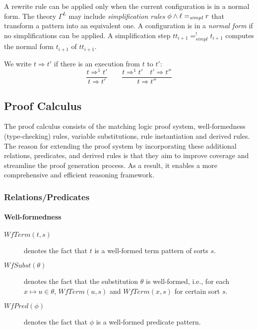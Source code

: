 \documentclass{article}
\theoremstyle{plain}
\theoremstyle{definition}
\newcommand{\WfTerm}{\ensuremath{\mathit{WfTerm}}}
\newcommand{\WfSubst}{\ensuremath{\mathit{WfSubst}}}
\newcommand{\WfPred}{\ensuremath{\mathit{WfPred}}}
\begin{document}
A rewrite rule can be applied only when the current configuration is in a normal form. 
The theory $\Gamma^L$ may include \emph{simplification rules} $\phi \land \ell =_ {\it simpl} r$ that transform a pattern into an equivalent one. A configuration is in a \emph{normal form} if no simplifications can be applied. A simplification step $tt_{i+1} =^!_ {simpl} t_ {i+1}$ computes the normal form $t_ {i+1}$ of $tt_ {i+1}$.

We write $t \Rightarrow t'$ if there is an execution from $t$ to $t'$:
\[
\dfrac{t\Rightarrow^1 t'}{t\Rightarrow t'}
\qquad
\dfrac{t\Rightarrow^1 t'\quad t'\Rightarrow t''}{t\Rightarrow t''}
\]

\subsection{Proof Calculus}
\label{sec:proof_calculus}

The proof calculus consists of the matching logic proof system, well-formedness (type-checking) rules, variable substitutions, rule instantiation and derived rules. The reason for extending the proof system by incorporating these additional relations, predicates, and derived rules is that they aim to improve coverage and streamline the proof generation process. As a result, it enables a more comprehensive and efficient reasoning framework.




\subsubsection{Relations/Predicates}

\paragraph{Well-formedness}


\begin{description}
\item[$\WfTerm(t,s)$] denotes the fact that $t$ is a well-formed term pattern of sorts $s$.
\item[$\WfSubst(\mbox{$\theta$})$] denotes the fact that the substitution $\theta$ is well-formed, i.e., for each $x\mapsto u \in \theta$, $\WfTerm(u,s)$ and $\WfTerm(x,s)$ for certain sort $s$.
\item[$\WfPred(\mbox{$\phi$})$] denotes the fact that $\phi$ is a well-formed predicate pattern.
\end{description}
\end{document}
